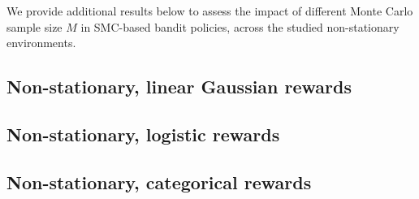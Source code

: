 
We provide additional results below to assess 
the impact of different Monte Carlo sample size $M$ in SMC-based bandit policies, across the studied non-stationary environments.

\subsection{Non-stationary, linear Gaussian rewards}
\label{assec:dynamic_bandits_gaussian}


\clearpage
\subsection{Non-stationary, logistic rewards}
\label{assec:dynamic_bandits_logistic}


\clearpage
\subsection{Non-stationary, categorical rewards}
\label{assec:dynamic_bandits_categorical}
